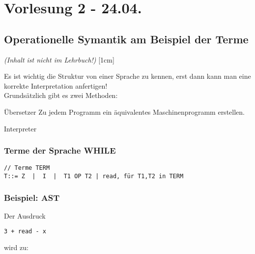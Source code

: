 \section{Vorlesung 2 - 24.04.}
\subsection{Operationelle Symantik am Beispiel der Terme}
\emph{(Inhalt ist nicht im Lehrbuch!)}
[1cm]

Es ist wichtig die Struktur von einer Sprache zu kennen, erst dann kann man eine korrekte Interpretation anfertigen!\\
Grundsätzlich gibt es zwei Methoden:
\begin{compactitem}
	\item[Übersetzer] Zu jedem Programm ein äquivalentes Maschinenprogramm erstellen.
	\item[Interpreter]
\end{compactitem}
\subsubsection{Terme der Sprache WHILE}
\begin{lstlisting}
// Terme TERM
T::= Z  |  I  |  T1 OP T2 | read, für T1,T2 in TERM
\end{lstlisting}

\subsubsection{Beispiel: AST}
Der Ausdruck
\begin{lstlisting}
3 + read - x 
\end{lstlisting}
wird zu:\\

